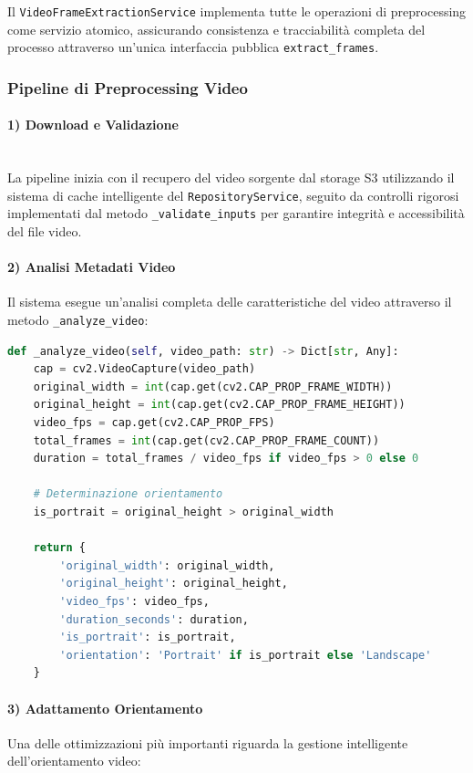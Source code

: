 Il \texttt{VideoFrameExtractionService} implementa tutte le operazioni di preprocessing come servizio atomico, assicurando consistenza e tracciabilità completa del processo attraverso un'unica interfaccia pubblica \texttt{extract\_frames}.

\subsubsection{Pipeline di Preprocessing Video}


\paragraph{1) Download e Validazione}
\mbox{}\\
La pipeline inizia con il recupero del video sorgente dal storage S3 utilizzando il sistema di cache intelligente del \texttt{RepositoryService}, seguito da controlli rigorosi implementati dal metodo \texttt{\_validate\_inputs} per garantire integrità e accessibilità del file video.

\paragraph{2) Analisi Metadati Video}
Il sistema esegue un'analisi completa delle caratteristiche del video attraverso il metodo \texttt{\_analyze\_video}:

\begin{lstlisting}[language=python, caption=Analisi metadati video completa]
	def _analyze_video(self, video_path: str) -> Dict[str, Any]:
	cap = cv2.VideoCapture(video_path)
	original_width = int(cap.get(cv2.CAP_PROP_FRAME_WIDTH))
	original_height = int(cap.get(cv2.CAP_PROP_FRAME_HEIGHT))
	video_fps = cap.get(cv2.CAP_PROP_FPS)
	total_frames = int(cap.get(cv2.CAP_PROP_FRAME_COUNT))
	duration = total_frames / video_fps if video_fps > 0 else 0
	
	# Determinazione orientamento
	is_portrait = original_height > original_width
	
	return {
		'original_width': original_width,
		'original_height': original_height,
		'video_fps': video_fps,
		'duration_seconds': duration,
		'is_portrait': is_portrait,
		'orientation': 'Portrait' if is_portrait else 'Landscape'
	}
\end{lstlisting}

\paragraph{3) Adattamento Orientamento}
Una delle ottimizzazioni più importanti riguarda la gestione intelligente dell'orientamento video:

